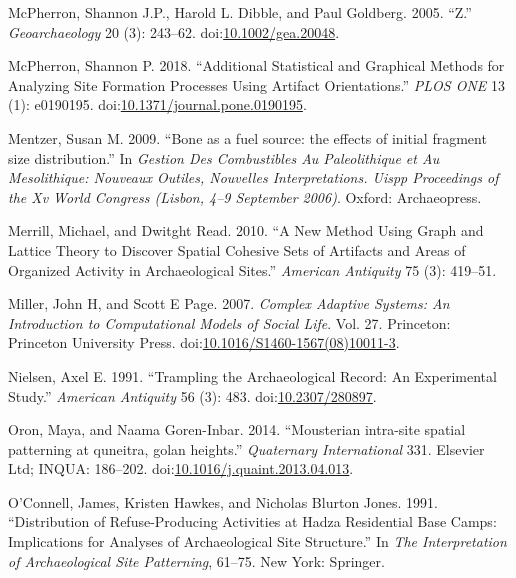 \documentclass[smallextended]{svjour3}       %
\begin{document}
\hypertarget{ref-McPherron2005a}{}
McPherron, Shannon J.P., Harold L. Dibble, and Paul Goldberg. 2005.
``Z.'' \emph{Geoarchaeology} 20 (3): 243--62.
doi:\href{https://doi.org/10.1002/gea.20048}{10.1002/gea.20048}.

\hypertarget{ref-mcpherron_additional_2018}{}
McPherron, Shannon P. 2018. ``Additional Statistical and Graphical
Methods for Analyzing Site Formation Processes Using Artifact
Orientations.'' \emph{PLOS ONE} 13 (1): e0190195.
doi:\href{https://doi.org/10.1371/journal.pone.0190195}{10.1371/journal.pone.0190195}.

\hypertarget{ref-Mentzer2009}{}
Mentzer, Susan M. 2009. ``Bone as a fuel source: the effects of initial
fragment size distribution.'' In \emph{Gestion Des Combustibles Au
Paleolithique et Au Mesolithique: Nouveaux Outiles, Nouvelles
Interpretations. Uispp Proceedings of the Xv World Congress (Lisbon,
4--9 September 2006)}. Oxford: Archaeopress.

\hypertarget{ref-Merrill2010}{}
Merrill, Michael, and Dwitght Read. 2010. ``A New Method Using Graph and
Lattice Theory to Discover Spatial Cohesive Sets of Artifacts and Areas
of Organized Activity in Archaeological Sites.'' \emph{American
Antiquity} 75 (3): 419--51.

\hypertarget{ref-Miller2007}{}
Miller, John H, and Scott E Page. 2007. \emph{Complex Adaptive Systems:
An Introduction to Computational Models of Social Life}. Vol. 27.
Princeton: Princeton University Press.
doi:\href{https://doi.org/10.1016/S1460-1567(08)10011-3}{10.1016/S1460-1567(08)10011-3}.

\hypertarget{ref-Nielsen1991}{}
Nielsen, Axel E. 1991. ``Trampling the Archaeological Record: An
Experimental Study.'' \emph{American Antiquity} 56 (3): 483.
doi:\href{https://doi.org/10.2307/280897}{10.2307/280897}.

\hypertarget{ref-Oron2014}{}
Oron, Maya, and Naama Goren-Inbar. 2014. ``Mousterian intra-site spatial
patterning at quneitra, golan heights.'' \emph{Quaternary International}
331. Elsevier Ltd; INQUA: 186--202.
doi:\href{https://doi.org/10.1016/j.quaint.2013.04.013}{10.1016/j.quaint.2013.04.013}.

\hypertarget{ref-OConnell1991}{}
O'Connell, James, Kristen Hawkes, and Nicholas Blurton Jones. 1991.
``Distribution of Refuse-Producing Activities at Hadza Residential Base
Camps: Implications for Analyses of Archaeological Site Structure.'' In
\emph{The Interpretation of Archaeological Site Patterning}, 61--75. New
York: Springer.
\end{document}

